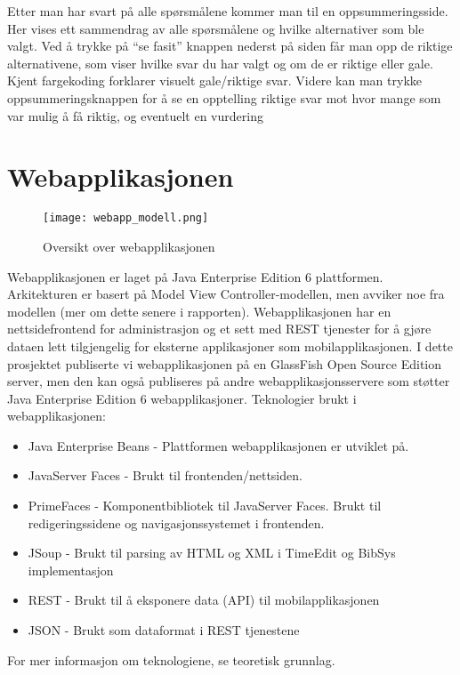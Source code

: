 \documentclass[../main.tex]{subfiles}
\begin{document}
Etter man har svart på alle spørsmålene kommer man til en oppsummeringsside. Her vises ett sammendrag av alle spørsmålene og hvilke alternativer som ble valgt. Ved å trykke på “se fasit” knappen nederst på siden får man opp de riktige alternativene, som viser hvilke svar du har valgt og om de er riktige eller gale. Kjent fargekoding forklarer visuelt gale/riktige svar.
Videre kan man trykke oppsummeringsknappen for å se en opptelling riktige svar mot hvor mange som var mulig å få riktig, og eventuelt en vurdering






\section{Webapplikasjonen}

\begin{figure}[H]
  \centering
  \texttt{[image: webapp\_modell.png]}
  \caption{Oversikt over webapplikasjonen}
\end{figure}

Webapplikasjonen er laget på Java Enterprise Edition 6 plattformen. Arkitekturen er basert på Model View Controller-modellen, men avviker noe fra modellen (mer om dette senere i rapporten). Webapplikasjonen har en nettsidefrontend for administrasjon og et sett med REST tjenester for å gjøre dataen lett tilgjengelig for eksterne applikasjoner som mobilapplikasjonen. I dette prosjektet publiserte vi webapplikasjonen på en GlassFish Open Source Edition server, men den kan også publiseres på andre webapplikasjonsservere som støtter Java Enterprise Edition 6 webapplikasjoner. \newline
\newline
Teknologier brukt i webapplikasjonen:
\begin{itemize}
\item Java Enterprise Beans - Plattformen webapplikasjonen er utviklet på.
\item JavaServer Faces - Brukt til frontenden/nettsiden.
\item PrimeFaces - Komponentbibliotek til JavaServer Faces. Brukt til redigeringssidene og navigasjonssystemet i frontenden.
\item JSoup - Brukt til parsing av HTML og XML i TimeEdit og BibSys implementasjon
\item REST - Brukt til å eksponere data (API) til mobilapplikasjonen
\item JSON - Brukt som dataformat i REST tjenestene
\end{itemize}
For mer informasjon om teknologiene, se teoretisk grunnlag.\newline
\end{document}
